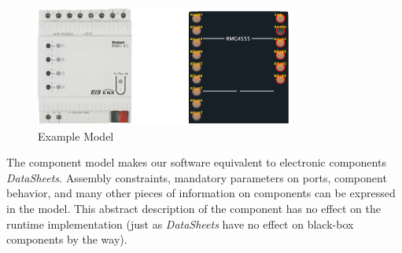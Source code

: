 \begin{figure}
\centering
\includegraphics[width=.7\textwidth]{part2/pics/RMG4sModel}
\caption{Example Model}
\label{fig:rmg4s}
\end{figure}

The component model makes our software equivalent to electronic components \textit{DataSheets}. Assembly constraints, mandatory parameters on ports, component behavior, and many other pieces of information on components can be expressed in the model. This abstract description of the component has no effect on the runtime implementation (just as \textit{DataSheets} have no effect on black-box components by the way).\\


